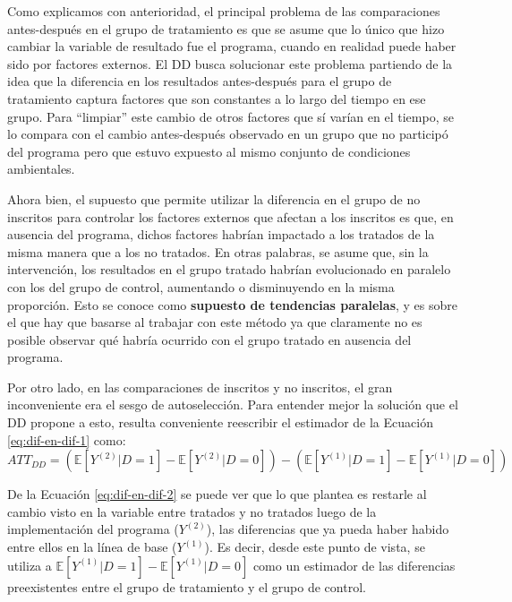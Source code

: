 \documentclass[../../main.tex]{subfiles}
\begin{document}
Como explicamos con anterioridad, el principal problema de las comparaciones antes-después
en el grupo de tratamiento es que se asume que lo único que hizo cambiar la variable de
resultado fue el programa, cuando en realidad puede haber sido por factores externos. El
DD busca solucionar este problema partiendo de la idea que la diferencia en los resultados
antes-después para el grupo de tratamiento captura factores que son constantes a lo largo
del tiempo en ese grupo. Para ``limpiar'' este cambio de otros factores que sí varían en
el tiempo, se lo compara con el cambio antes-después observado en un grupo que no
participó del programa pero que estuvo expuesto al mismo conjunto de condiciones
ambientales.

Ahora bien, el supuesto que permite utilizar la diferencia en el grupo de no inscritos
para controlar los factores externos que afectan a los inscritos es que, en ausencia del
programa, dichos factores habrían impactado a los tratados de la misma manera que a los no
tratados. En otras palabras, se asume que, sin la intervención, los resultados en el grupo
tratado habrían evolucionado en paralelo con los del grupo de control, aumentando o
disminuyendo en la misma proporción. Esto se conoce como \textbf{supuesto de tendencias
paralelas}, y es sobre el que hay que basarse al trabajar con este método ya que
claramente no es posible observar qué habría ocurrido con el grupo tratado en ausencia del
programa.

Por otro lado, en las comparaciones de inscritos y no inscritos, el gran inconveniente era
el sesgo de autoselección. Para entender mejor la solución que el DD propone a esto,
resulta conveniente reescribir el estimador de la Ecuación \ref{eq:dif-en-dif-1} como:
\begin{equation}
    ATT_{DD} =
        \left(
            \mathbb{E}\left[Y^{(2)}|D=1\right] - \mathbb{E}\left[Y^{(2)}|D=0\right]
        \right) -
        \left(
            \mathbb{E}\left[Y^{(1)}|D=1\right] - \mathbb{E}\left[Y^{(1)}|D=0\right]
        \right)
        \label{eq:dif-en-dif-2}
\end{equation}

De la Ecuación \ref{eq:dif-en-dif-2} se puede ver que lo que plantea es restarle al cambio
visto en la variable entre tratados y no tratados luego de la implementación del programa
(\(Y^{(2)}\)), las diferencias que ya pueda haber habido entre ellos en la línea de base
(\(Y^{(1)}\)). Es decir, desde este punto de vista, se utiliza a
\(\mathbb{E}\left[Y^{(1)}|D=1\right] - \mathbb{E}\left[Y^{(1)}|D=0\right]\) como un
estimador de las diferencias preexistentes entre el grupo de tratamiento y el grupo de
control.
\end{document}
